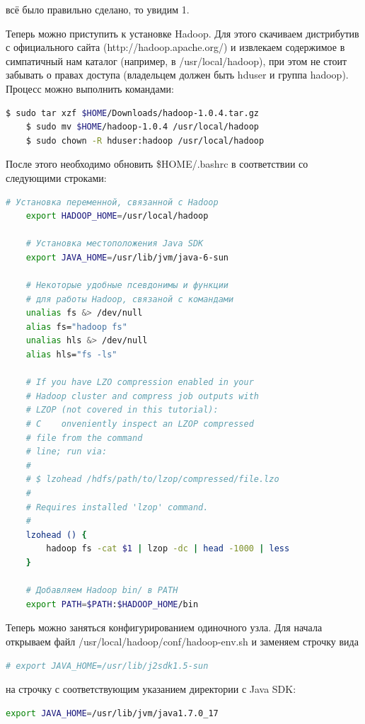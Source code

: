 \documentclass[12pt,a4paper]{extarticle} %
\begin{document}
     всё было правильно сделано, то увидим 1.

\noindent Теперь можно приступить  к установке Hadoop. Для этого скачиваем дистрибутив с официального сайта (http://hadoop.apache.org/)  и извлекаем содержимое в симпатичный нам каталог (например, в /usr/local/hadoop), при этом не стоит забывать о правах доступа (владельцем должен быть hduser и группа hadoop). Процесс можно выполнить командами:
\begin{lstlisting}[language=sh]
    $ sudo tar xzf $HOME/Downloads/hadoop-1.0.4.tar.gz
    $ sudo mv $HOME/hadoop-1.0.4 /usr/local/hadoop
    $ sudo chown -R hduser:hadoop /usr/local/hadoop
\end{lstlisting}

\noindent После этого необходимо обновить \$HOME/.bashrc в соответствии со следующими строками:
\begin{lstlisting}[language=sh]
    # Установка переменной, связанной с Hadoop
    export HADOOP_HOME=/usr/local/hadoop

    # Установка местоположения Java SDK
    export JAVA_HOME=/usr/lib/jvm/java-6-sun

    # Некоторые удобные псевдонимы и функции
    # для работы Hadoop, связаной с командами
    unalias fs &> /dev/null
    alias fs="hadoop fs"
    unalias hls &> /dev/null
    alias hls="fs -ls"

    # If you have LZO compression enabled in your 
    # Hadoop cluster and compress job outputs with 
    # LZOP (not covered in this tutorial):
    # C    onveniently inspect an LZOP compressed 
    # file from the command
    # line; run via:
    #
    # $ lzohead /hdfs/path/to/lzop/compressed/file.lzo
    #
    # Requires installed 'lzop' command.
    #
    lzohead () {
        hadoop fs -cat $1 | lzop -dc | head -1000 | less
    }

    # Добавляем Hadoop bin/ в PATH
    export PATH=$PATH:$HADOOP_HOME/bin
\end{lstlisting}

\noindent Теперь можно заняться конфигурированием одиночного узла. Для начала открываем файл /usr/local/hadoop/conf/hadoop-env.sh и заменяем строчку вида
\begin{lstlisting}[language=sh]
    # export JAVA_HOME=/usr/lib/j2sdk1.5-sun
\end{lstlisting}
на строчку с соответствующим указанием директории с Java SDK:
\begin{lstlisting}[language=sh]
    export JAVA_HOME=/usr/lib/jvm/java1.7.0_17
\end{lstlisting}
\end{document}
